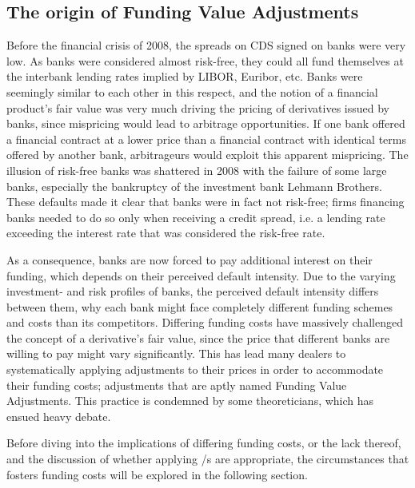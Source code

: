 \documentclass[./sub-main.tex]{subfiles}
\begin{document}
    \subsection{The origin of Funding Value Adjustments}
        Before the financial crisis of 2008, the spreads on CDS signed on banks were very low. 
        As banks were considered almost risk-free, 
        they could all fund themselves at the interbank lending rates implied by LIBOR, Euribor, etc.
        Banks were seemingly similar to each other in this respect, 
        and the notion of a financial product's fair value was very much driving the pricing of derivatives issued by banks,
        since mispricing would lead to arbitrage opportunities.
        If one bank offered a financial contract at a lower price than a financial contract with identical terms
        offered by another bank, arbitrageurs would exploit this apparent mispricing. 
        The illusion of risk-free banks was shattered in 2008 with the failure of some large banks, 
        especially the bankruptcy of the investment bank Lehmann Brothers.
        These defaults made it clear that banks were in fact not risk-free; 
        firms financing banks needed to do so only when receiving a credit spread,
        i.e. a lending rate exceeding the interest rate that was considered the risk-free rate. 
        
        As a consequence, banks are now forced to pay additional interest on their funding, 
        which depends on their perceived default intensity.
        Due to the varying investment- and risk profiles of banks, 
        the perceived default intensity differs between them, 
        why each bank might face completely different funding schemes and costs than its competitors.
        Differing funding costs have massively challenged the concept of a derivative's fair value,
        since the price that different banks are willing to pay might vary significantly. 
        This has lead many dealers to systematically applying adjustments to their prices
        in order to accommodate their funding costs; 
        adjustments that are aptly named Funding Value Adjustments. 
        This practice is condemned by some theoreticians, 
        which has ensued heavy debate.
        
        Before diving into the implications of differing funding costs, or the lack thereof,
        and the discussion of whether applying \FVA/s are appropriate,
        the circumstances that fosters funding costs will be explored in the following section.
\end{document}
